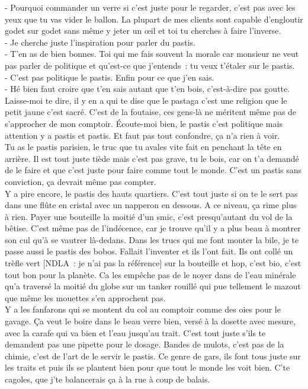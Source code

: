 - Pourquoi commander un verre si c’est juste pour le regarder, c’est pas avec les yeux que tu vas vider le ballon. La plupart de mes clients sont capable d’engloutir godet sur godet sans même y jeter un œil et toi tu cherches à faire l’inverse.\\
- Je cherche juste l’inspiration pour parler du pastis.\\
- T’en as de bien bonnes. Toi qui me fais souvent la morale car monsieur ne veut pas parler de politique et qu’est-ce que j’entends : tu veux t’étaler sur le pastis.\\
- C’est pas politique le pastis. Enfin pour ce que j’en sais.\\
- Hé bien faut croire que t’en sais autant que t’en bois, c’est-à-dire pas goutte. Laisse-moi te dire, il y en a qui te dise que le pastaga c’est une religion que le petit jaune c’est sacré. C’est de la foutaise, ces gens-là ne méritent même pas de s’approcher de mon comptoir. Écoute-moi bien, le pastis c’est politique mais attention y a pastis et pastis. Et faut pas tout confondre, ça n’a rien à voir.\\
Tu as le pastis parisien, le truc que tu avales vite fait en penchant la tête en arrière. Il est tout juste tiède mais c’est pas grave, tu le bois, car on t’a demandé de le faire et que c’est juste pour faire comme tout le monde. C’est un pastis sans conviction, ça devrait même pas compter.\\
Y a pire encore, le pastis des hauts quartiers. C’est tout juste si on te le sert pas dans une flûte en cristal avec un napperon en dessous. A ce niveau, ça rime plus à rien. Payer une bouteille la moitié d’un smic, c’est presqu’autant du vol de la bêtise. C’est même pas de l’indécence, car je trouve qu’il y a plus beau à montrer son cul qu’à se vautrer là-dedans.
Dans les trucs qui me font monter la bile, je te passe aussi le pastis des bobos. Fallait l’inventer et ils l’ont fait. Ils ont collé un trèfle vert [NDLA : je n’ai pas la référence] sur la bouteille et hop, c’est bio, c’est tout bon pour la planète. Ca les empêche pas de le noyer dans de l’eau minérale qu’a traversé la moitié du globe sur un tanker rouillé qui pue tellement le mazout que même les mouettes s’en approchent pas.\\
Y a les fanfarons qui se montent du col au comptoir comme des oies pour le gavage. Ça veut le boire dans le beau verre bien, versé à la dosette avec mesure, avec la carafe qui va bien et l’eau jusqu’au trait. C’est tout juste s’ils te demandent pas une pipette pour le dosage. Bandes de mulots, c’est pas de la chimie, c’est de l’art de le servir le pastis. Ce genre de gars, ils font tous juste sur les traits et puis ils se plantent bien pour que tout le monde les voit bien. C’te cagoles, que j’te balancerais ça à la rue à coup de balais.\\
